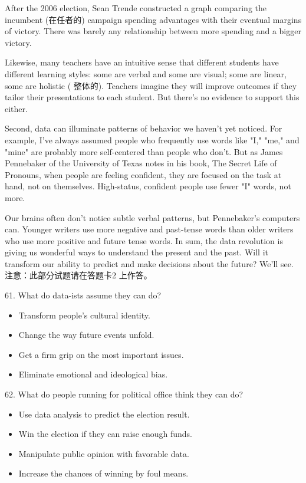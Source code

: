 \documentclass[UTF8,11pt]{ctexart}
\begin{document}
After the 2006 election, Sean Trende constructed a graph comparing the incumbent (在任者的) campaign spending advantages with their eventual margins of victory. There was barely any relationship between more spending and a bigger victory.


Likewise, many teachers have an intuitive sense that different students have different learning styles: some are verbal and some are visual; some are linear, some are holistic ( 整体的). Teachers imagine they will improve outcomes if they tailor their presentations to each student. But there's no evidence to support this either.


Second, data can illuminate patterns of behavior we haven't yet noticed. For example, I've always assumed people who frequently use words like "I," "me," and "mine" are probably more self-centered than people who don't. But as James Pennebaker of the University of Texas notes in his book, The Secret Life of Pronouns, when people are feeling confident, they are focused on the task at hand, not on themselves. High-status, confident people use fewer "I" words, not more.


Our brains often don't notice subtle verbal patterns, but Pennebaker's computers can. Younger writers use more negative and past-tense words than older writers who use more positive and future tense words. In sum, the data revolution is giving us wonderful ways to understand the present and the past. Will it transform our ability to predict and make decisions about the future? We'll see. 注意：此部分试题请在答题卡2 上作答。


61. What do data-ists assume they can do?


\begin{itemize}[leftmargin=2em,itemsep=.2em,topsep=.4em]\item[A.] Transform people's cultural identity.
\item[B.] Change the way future events unfold.
\item[C.] Get a firm grip on the most important issues.
\item[D.] Eliminate emotional and ideological bias.
\end{itemize}

62. What do people running for political office think they can do?


\begin{itemize}[leftmargin=2em,itemsep=.2em,topsep=.4em]\item[A.] Use data analysis to predict the election result.
\item[B.] Win the election if they can raise enough funds.
\item[C.] Manipulate public opinion with favorable data.
\item[D.] Increase the chances of winning by foul means.
\end{itemize}
\end{document}
